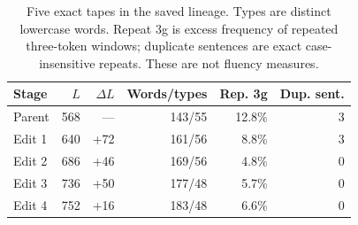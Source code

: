 \begin{table}[t]
\centering\scriptsize
\setlength{\tabcolsep}{2pt}
\begin{tabular}{@{}lrrrrr@{}}
\toprule
Stage & $L$ & $\Delta L$ & Words/types & Rep. 3g & Dup. sent. \\
\midrule
Parent & 568 & --- & 143/55 & 12.8\% & 3 \\
Edit 1 & 640 & +72 & 161/56 & 8.8\% & 3 \\
Edit 2 & 686 & +46 & 169/56 & 4.8\% & 0 \\
Edit 3 & 736 & +50 & 177/48 & 5.7\% & 0 \\
Edit 4 & 752 & +16 & 183/48 & 6.6\% & 0 \\
\bottomrule
\end{tabular}
\caption{Five exact tapes in the saved lineage. Types are distinct lowercase words. Repeat 3g is excess frequency of repeated three-token windows; duplicate sentences are exact case-insensitive repeats. These are not fluency measures.}
\label{tab:lineage}
\end{table}
